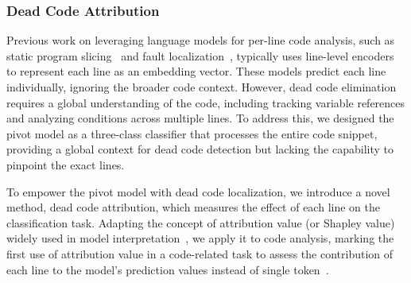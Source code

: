 \documentclass[11pt]{article}
\begin{document}

\subsubsection{Dead Code Attribution} Previous work on leveraging language models for per-line code analysis, such as static program slicing~\cite{yadavally2024learning} and fault localization~\cite{yang2024large}, typically uses line-level encoders to represent each line as an embedding vector. These models predict each line individually, ignoring the broader code context. However, dead code elimination requires a global understanding of the code, including tracking variable references and analyzing conditions across multiple lines. To address this, we designed the pivot model as a three-class classifier that processes the entire code snippet, providing a global context for dead code detection but lacking the capability to pinpoint the exact lines.


To empower the pivot model with dead code localization, we introduce a novel method, dead code attribution, which measures the effect of each line on the classification task. Adapting the concept of attribution value (or Shapley value) widely used in model interpretation~\cite{mosca2022shap, nguyen2021effectiveness}, we apply it to code analysis, marking the first use of attribution value in a code-related task to assess the contribution of each line to the model's prediction values instead of single token~\cite{li2016understanding, kim2020interpretation}.
\end{document}
